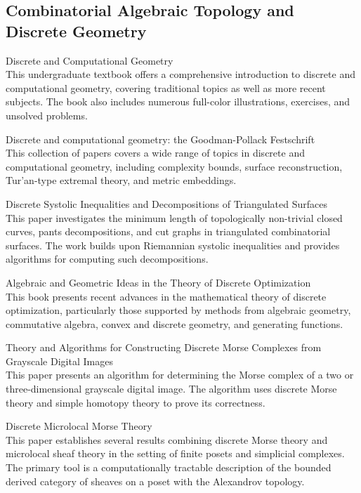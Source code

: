 \documentclass{article}
\begin{document}
\subsection{Combinatorial Algebraic Topology and Discrete Geometry}

\cite{Devadoss2011DiscreteAC} Discrete and Computational Geometry \\
This undergraduate textbook offers a comprehensive introduction to discrete and computational geometry, covering traditional topics as well as more recent subjects. The book also includes numerous full-color illustrations, exercises, and unsolved problems.

\cite{Aronov2003DiscreteAC} Discrete and computational geometry: the Goodman-Pollack Festschrift \\
This collection of papers covers a wide range of topics in discrete and computational geometry, including complexity bounds, surface reconstruction, Tur'an-type extremal theory, and metric embeddings.

\cite{Verdire2014DiscreteSI} Discrete Systolic Inequalities and Decompositions of Triangulated Surfaces \\
This paper investigates the minimum length of topologically non-trivial closed curves, pants decompositions, and cut graphs in triangulated combinatorial surfaces. The work builds upon Riemannian systolic inequalities and provides algorithms for computing such decompositions.

\cite{Loera2012AlgebraicAG} Algebraic and Geometric Ideas in the Theory of Discrete Optimization \\
This book presents recent advances in the mathematical theory of discrete optimization, particularly those supported by methods from algebraic geometry, commutative algebra, convex and discrete geometry, and generating functions.

\cite{Robins2011TheoryAA} Theory and Algorithms for Constructing Discrete Morse Complexes from Grayscale Digital Images \\
This paper presents an algorithm for determining the Morse complex of a two or three-dimensional grayscale digital image. The algorithm uses discrete Morse theory and simple homotopy theory to prove its correctness.

\cite{Brown2022DiscreteMM} Discrete Microlocal Morse Theory \\
This paper establishes several results combining discrete Morse theory and microlocal sheaf theory in the setting of finite posets and simplicial complexes. The primary tool is a computationally tractable description of the bounded derived category of sheaves on a poset with the Alexandrov topology.
\end{document}
